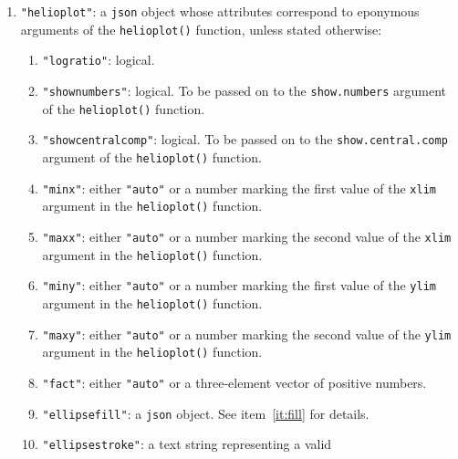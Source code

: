 \begin{refsection}
\begin{enumerate}[leftmargin=\parindent,align=left,
      labelwidth=\parindent,label*=2.\arabic*.]
\begin{enumerate}[leftmargin=\parindent,align=left,
      labelwidth=\parindent,label*=\arabic*.]
    \item{\tt "nnlines"}: logical.
    \item{\tt "pch"}: a valid plot character according to
      \texttt{?par} in \texttt{R}.
    \item{\tt "pos"}: an integer from 0 to 4.
    \item{\tt "cex"}: a postive number.
    \item{\tt "col"}: a text string representing a valid colour code
      or name.
    \item{\tt "bg"}: a text string representing a valid colour code or
      name.
  \end{enumerate}
\item{\tt "helioplot"}: a \texttt{json} object whose attributes
  correspond to eponymous arguments of the \texttt{helioplot()}
  function, unless stated otherwise:
  \begin{enumerate}[leftmargin=\parindent,align=left,
      labelwidth=\parindent,label*=\arabic*.]
    \item{\tt "logratio"}: logical.
    \item{\tt "shownumbers"}: logical.  To be passed on to the
      \texttt{show.numbers} argument of the \texttt{helioplot()}
      function.
    \item{\tt "showcentralcomp"}: logical.  To be passed on to the
      \texttt{show.central.comp} argument of the \texttt{helioplot()}
      function.
    \item{\tt "minx"}: either \texttt{"auto"} or a number marking the
      first value of the \texttt{xlim} argument in the
      \texttt{helioplot()} function.
    \item{\tt "maxx"}: either \texttt{"auto"} or a number marking the
      second value of the \texttt{xlim} argument in the
      \texttt{helioplot()} function.
    \item{\tt "miny"}: either \texttt{"auto"} or a number marking the
      first value of the \texttt{ylim} argument in the
      \texttt{helioplot()} function.
    \item{\tt "maxy"}: either \texttt{"auto"} or a number marking the
      second value of the \texttt{ylim} argument in the
      \texttt{helioplot()} function.
    \item{\tt "fact"}: either \texttt{"auto"} or a three-element
      vector of positive numbers.
      \item{\tt "ellipsefill"}: a \texttt{json} object. See
        item~\ref{it:fill} for details.
      \item{\tt "ellipsestroke"}: a text string representing a valid

\end{enumerate}
\end{enumerate}
\end{refsection}
